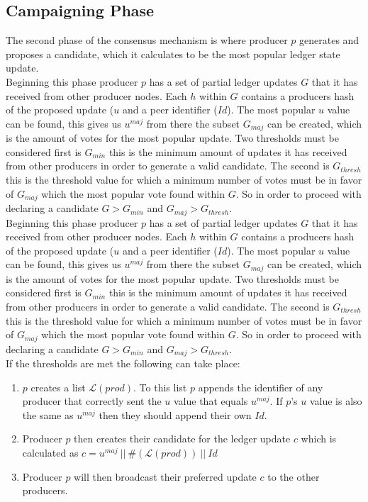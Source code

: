 \documentclass{article}
\begin{document}

\subsection{Campaigning Phase}

The second phase of the consensus mechanism is where producer $p$ generates and proposes a candidate, which it calculates to be the most popular ledger state update. \\


Beginning this phase producer $p$ has a set of partial ledger updates $G$ that it has received from other producer nodes. Each $h$ within $G$ contains a producers hash of the proposed update ($u$ and a peer identifier ($Id$). The most popular $u$ value can be found, this gives us $u^{maj}$ from there the subset $G_{maj}$ can be created, which is the amount of votes for the most popular update. Two thresholds must be considered first is $G_{min}$ this is the minimum amount of updates it has received from other producers in order to generate a valid candidate. The second is $G_{thresh}$ this is the threshold value for which a minimum number of votes must be in favor of $G_{maj}$ which the most popular vote found within $G$.  So in order to proceed with declaring a candidate $G > G_{min}$ and $G_{maj} > G_{thresh}$. \\

Beginning this phase producer $p$ has a set of partial ledger updates $G$ that it has received from other producer nodes. Each $h$ within $G$ contains a producers hash of the proposed update ($u$ and a peer identifier ($Id$). The most popular $u$ value can be found, this gives us $u^{maj}$ from there the subset $G_{maj}$ can be created, which is the amount of votes for the most popular update. Two thresholds must be considered first is $G_{min}$ this is the minimum amount of updates it has received from other producers in order to generate a valid candidate. The second is $G_{thresh}$ this is the threshold value for which a minimum number of votes must be in favor of $G_{maj}$ which the most popular vote found within $G$.  So in order to proceed with declaring a candidate $G > G_{min}$ and $G_{maj} > G_{thresh}$. \\

If the thresholds are met the following can take place:

\begin{enumerate}
\item $p$ creates a list $\mathcal{L}(prod)$. To this list $p$ appends the identifier of any producer that correctly sent the $u$ value that equals $u^{maj}$. If $p$'s $u$ value is also the same as $u^{maj}$ then they should append their own $Id$.
\item Producer $p$ then creates their candidate for the ledger update $c$ which is calculated as $c = u^{maj}~||~\#(\mathcal{L}(prod))~||~Id$
\item Producer $p$ will then broadcast their preferred update $c$ to the other producers.
\end{enumerate}
\end{document}
